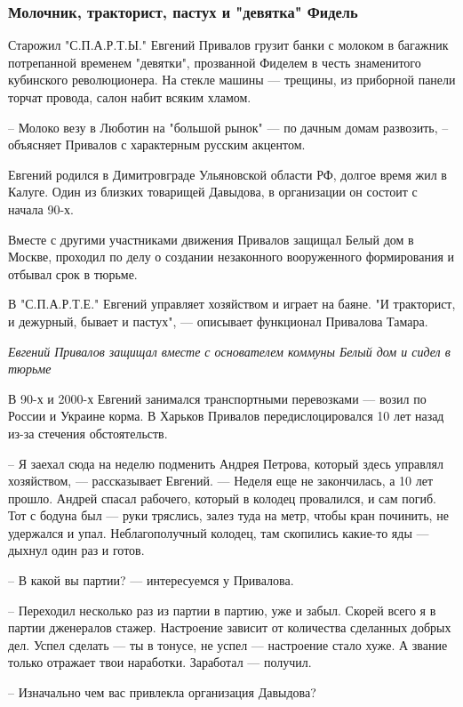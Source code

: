 \documentclass[a4paper,11pt]{extreport}
\begin{document}
\subsubsection{Молочник, тракторист, пастух и "девятка" Фидель}

Старожил "С.П.А.Р.Т.Ы." Евгений Привалов грузит банки с молоком в багажник
потрепанной временем "девятки", прозванной Фиделем в честь знаменитого
кубинского революционера. На стекле машины --- трещины, из приборной панели
торчат провода, салон набит всяким хламом.

– Молоко везу в Люботин на "большой рынок" --- по дачным домам развозить, –
объясняет Привалов с характерным русским акцентом.

Евгений родился в Димитровграде Ульяновской области РФ, долгое время жил в
Калуге. Один из близких товарищей Давыдова, в организации он состоит с начала
90-х. 

Вместе с другими участниками движения Привалов защищал Белый дом в Москве,
проходил по делу о создании незаконного вооруженного формирования и отбывал
срок в тюрьме.

В "С.П.А.Р.Т.Е." Евгений управляет хозяйством и играет на баяне. "И тракторист,
и дежурный, бывает и пастух", --- описывает функционал Привалова Тамара.

\emph{Евгений Привалов защищал вместе с основателем коммуны Белый дом и сидел в
тюрьме}

В 90-х и 2000-х Евгений занимался транспортными перевозками --- возил по России и
Украине корма. В Харьков Привалов передислоцировался 10 лет назад из-за
стечения обстоятельств.

– Я заехал сюда на неделю подменить Андрея Петрова, который здесь управлял
хозяйством, --- рассказывает Евгений. --- Неделя еще не закончилась, а 10 лет
прошло. Андрей спасал рабочего, который в колодец провалился, и сам погиб. Тот
с бодуна был --- руки тряслись, залез туда на метр, чтобы кран починить, не
удержался и упал. Неблагополучный колодец, там скопились какие-то яды --- дыхнул
один раз и готов.

– В какой вы партии? --- интересуемся у Привалова.

– Переходил несколько раз из партии в партию, уже и забыл. Скорей всего я в
партии дженералов стажер. Настроение зависит от количества сделанных добрых
дел. Успел сделать --- ты в тонусе, не успел --- настроение стало хуже. А звание
только отражает твои наработки. Заработал --- получил.

– Изначально чем вас привлекла организация Давыдова?
\end{document}
